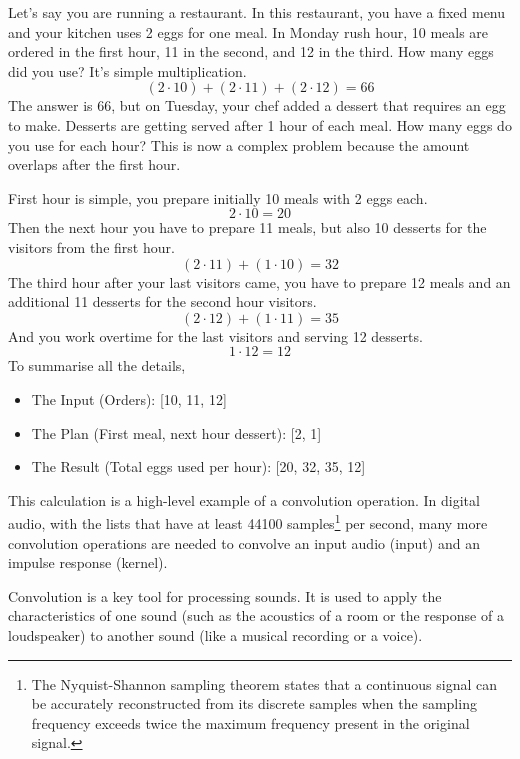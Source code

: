             Let's say you are running a restaurant. In this restaurant, you have a fixed menu and your kitchen uses 2 eggs for one meal. In Monday rush hour, 10 meals are ordered in the first hour, 11 in the second, and 12 in the third. How many eggs did you use? It's simple multiplication. 
            $$(2\cdot10)+(2\cdot11)+(2\cdot12)=66$$
            The answer is 66, but on Tuesday, your chef added a dessert that requires an egg to make. Desserts are getting served after 1 hour of each meal. How many eggs do you use for each hour? This is now a complex problem because the amount overlaps after the first hour.

            First hour is simple, you prepare initially 10 meals with 2 eggs each. 
            $$2\cdot10=20$$
            Then the next hour you have to prepare 11 meals, but also 10 desserts for the visitors from the first hour.
            $$(2\cdot11)+(1\cdot10)=32$$
            The third hour after your last visitors came, you have to prepare 12 meals and an additional 11 desserts for the second hour visitors.
            $$(2\cdot12)+(1\cdot11)=35$$
            And you work overtime for the last visitors and serving 12 desserts.
            $$1\cdot12=12$$
            To summarise all the details,\par
            \begin{itemize}
                \item The Input (Orders): [10, 11, 12]
                \item The Plan (First meal, next hour dessert): [2, 1]
                \item The Result (Total eggs used per hour): [20, 32, 35, 12]
            \end{itemize}
            This calculation is a high-level example of a convolution operation. In digital audio, with the lists that have at least 44100 samples\footnote{The Nyquist-Shannon sampling theorem states that a continuous signal can be accurately reconstructed from its discrete samples when the sampling frequency exceeds twice the maximum frequency present in the original signal\cite{Digital_Audio_Theory}.} per second, many more convolution operations are needed to convolve an input audio (input) and an impulse response (kernel).\par

            Convolution is a key tool for processing sounds. It is used to apply the characteristics of one sound (such as the acoustics of a room or the response of a loudspeaker) to another sound (like a musical recording or a voice).\par


